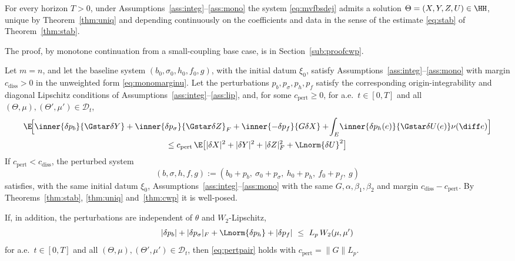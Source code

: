 \begin{theorem}\label{thm:cwp}
For every horizon $T>0$, under Assumptions~\ref{ass:integ}--\ref{ass:mono} the system
\eqref{eq:mvfbsdej} admits a solution $\Theta=(X,Y,Z,U)\in\HH$, unique by
Theorem~\ref{thm:uniq} and depending continuously on the coefficients and data in the
sense of the estimate \eqref{eq:stab} of Theorem~\ref{thm:stab}.
\end{theorem}
\noindent The proof, by monotone continuation from a small-coupling base case, is in
Section~\ref{sub:proofcwp}.

\begin{corollary}\label{cor:robust}
Let $m=n$, and let the baseline system $(b_0,\sigma_0,h_0,f_0,g)$, with the initial
datum $\xi_0$, satisfy Assumptions~\ref{ass:integ}--\ref{ass:mono} with margin
$c_{\mathrm{diss}}>0$ in the unweighted form \eqref{eq:monomarginu}. Let the perturbations
$p_b,p_\sigma,p_h,p_f$ satisfy the corresponding origin-integrability and diagonal
Lipschitz conditions of Assumptions~\ref{ass:integ}--\ref{ass:lip}, and, for some
$c_{\mathrm{pert}}\ge0$, for a.e.\ $t\in[0,T]$ and all
$(\Theta,\mu),(\Theta',\mu')\in\mathcal D_t$,
\begin{multline}\label{eq:pertpair}
\E\!\Big[\inner{\delta p_b}{\Gstar\delta Y}+\inner{\delta p_\sigma}{\Gstar\delta Z}_F
+\inner{-\delta p_f}{G\delta X}+\!\int_E\!\inner{\delta p_h(e)}{\Gstar\delta U(e)}\nu(\diff e)\Big]\\
\le c_{\mathrm{pert}}\,\E\big[|\delta X|^2+|\delta Y|^2+|\delta Z|_F^2+\Lnorm{\delta U}^2\big]
\end{multline}
If
$c_{\mathrm{pert}}<c_{\mathrm{diss}}$, the perturbed system
\[
(b,\sigma,h,f,g):=(b_0+p_b,\ \sigma_0+p_\sigma,\ h_0+p_h,\ f_0+p_f,\ g)
\]
satisfies, with the same initial datum $\xi_0$, Assumptions~\ref{ass:integ}--\ref{ass:mono}
with the same $G,\alpha,\beta_1,\beta_2$ and margin $c_{\mathrm{diss}}-c_{\mathrm{pert}}$. By
Theorems~\ref{thm:stab}, \ref{thm:uniq} and~\ref{thm:cwp} it is well-posed.

If, in addition, the perturbations are independent of $\theta$ and $W_2$-Lipschitz,
\begin{equation}\label{eq:pertlip}
|\delta p_b|+|\delta p_\sigma|_F+\Lnorm{\delta p_h}+|\delta p_f|\ \le\ L_p\,W_2(\mu,\mu')
\end{equation}
for a.e.\ $t\in[0,T]$ and all $(\Theta,\mu),(\Theta',\mu')\in\mathcal D_t$, then
\eqref{eq:pertpair} holds with
$c_{\mathrm{pert}}=\|G\|L_p$.
\end{corollary}
